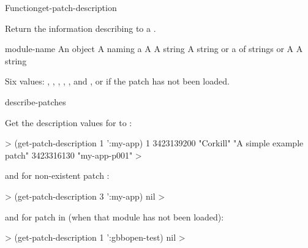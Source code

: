 \documentclass[10pt,twoside,english,pdftex]{article}
\begin{document}
\begin{functiondoc}{Function}{get-patch-description}%
  {
    }
%

\fnsyntax 

\fnpurpose Return the information describing   to a
.

\fnpackage {}

\fnmodule {}

\fnargs
\begin{args}{module-name}
\arg[id] An object
 A  naming a 
\arg[date] A 
\arg[author] A string
\arg[description] A string or a  of strings or \nil
{} A 
 A string
\end{args}

\fnreturns Six values: , , ,
, , and
, or \nil{} if the patch has not been loaded.

\fnerrors
\modulenotdefined

\begin{alsos}{describe-patches}
\also[patch]
\end{alsos}

\fnexamples
%
Get the description values for   to 
:
%
\W\supp
\begin{example}
  > (get-patch-description 1 ':my-app)
  1
  3423139200
  "Corkill"
  "A simple example patch"
  3423316130
  "my-app-p001"
  >
\end{example}
%
and for non-existent patch :
%
\W\supp\notpretop
\begin{example}
  > (get-patch-description 3 ':my-app)
  nil
  >
\end{example}
%
and for patch  in   (when
that module has not been loaded):
%
\W\supp\notpretop
\begin{example}
  > (get-patch-description 1 ':gbbopen-test)
  nil
  >
\end{example}

\end{functiondoc}
\end{document}
